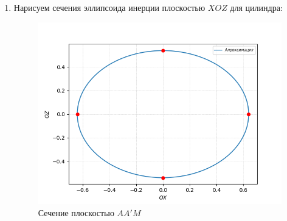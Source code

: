 \documentclass[a4paper, 12pt]{article}
\begin{document}
\begin{enumerate}
		\item Нарисуем сечения эллипсоида инерции плоскостью $XOZ$ для цилиндра:
		\begin{figure}
			\centering
			\caption{Сечение плоскостью $AA'M$}
			\includegraphics[scale = 0.8]{pictures/graph.png}
		\end{figure}



\end{enumerate}
\end{document}
